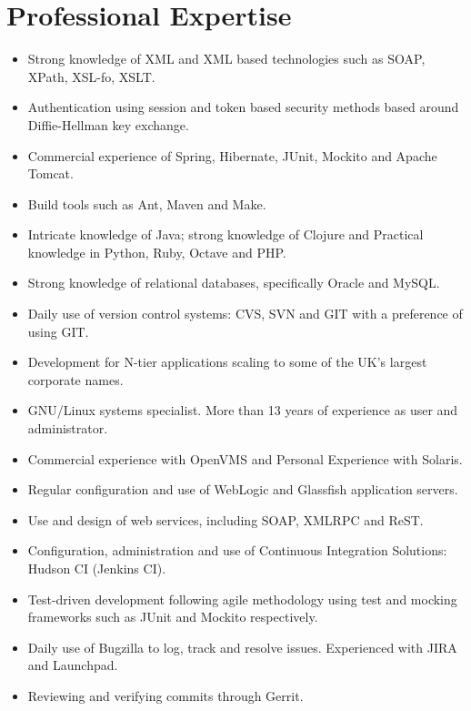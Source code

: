 \documentclass[a4paper,10pt]{moderncv}
\begin{document}
\section{Professional Expertise}
\begin{itemize}
\item Strong knowledge of XML and XML based technologies such as SOAP, XPath, XSL-fo, XSLT.
\item Authentication using session and token based security methods based around Diffie-Hellman key exchange.
\item Commercial experience of Spring, Hibernate, JUnit, Mockito and Apache Tomcat.
\item Build tools such as Ant, Maven and Make.
\item Intricate knowledge of Java; strong knowledge of Clojure and Practical knowledge in Python, Ruby, Octave and PHP.
\item Strong knowledge of relational databases, specifically Oracle and MySQL.
\item Daily use of version control systems: CVS, SVN and GIT with a preference of using GIT.
\item Development for N-tier applications scaling to some of the UK's largest corporate names.
\item GNU/Linux systems specialist. More than 13 years of experience as user
  and administrator.
\item Commercial experience with OpenVMS and Personal Experience with Solaris.
\item Regular configuration and use of WebLogic and Glassfish application servers.
\item Use and design of web services, including SOAP, XMLRPC and ReST.
\item Configuration, administration and use of Continuous Integration
Solutions: Hudson CI (Jenkins CI).
\item Test-driven development following agile methodology using test and mocking frameworks such as JUnit and Mockito respectively.
\item Daily use of Bugzilla to log, track and resolve issues. Experienced with JIRA and Launchpad.
\item Reviewing and verifying commits through Gerrit.
\end{itemize}
\end{document}
